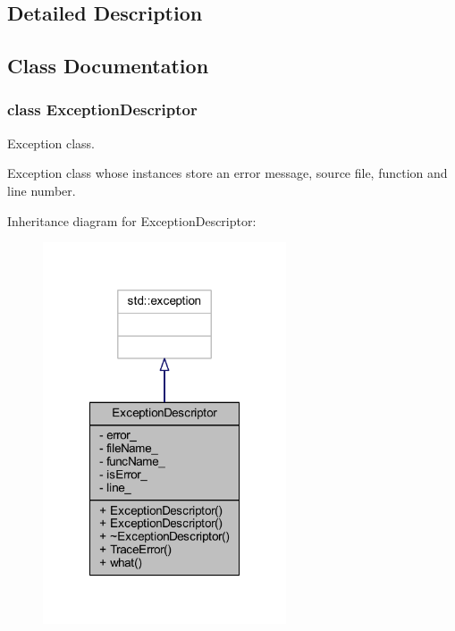 \subsection{Detailed Description}


\subsection{Class Documentation}
\label{class_exception_descriptor}
\hypertarget{group___core_class_exception_descriptor}{}
\subsubsection{class Exception\-Descriptor}
Exception class. 

Exception class whose instances store an error message, source file, function and line number. 

Inheritance diagram for Exception\-Descriptor\-:
\nopagebreak
\begin{figure}[H]
\begin{center}
\leavevmode
\includegraphics[width=204pt]{class_exception_descriptor__inherit__graph}
\end{center}
\end{figure}



